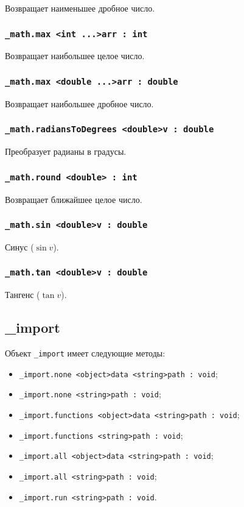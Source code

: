 \documentclass[a4paper, 14pt]{extarticle}
\newenvironment{icItems}
	{ \begin{itemize} [noitemsep,nolistsep] }
	{ \end{itemize} }
\begin{document}
Возвращает наименьшее дробное число.

\subsubsection{\lstinline|_math.max <int ...>arr : int|}

Возвращает наибольшее целое число.

\subsubsection{\lstinline|_math.max <double ...>arr : double|}

Возвращает наибольшее дробное число.

\subsubsection{\lstinline|_math.radiansToDegrees <double>v : double|}

Преобразует радианы в градусы.

\subsubsection{\lstinline|_math.round <double> : int|}

Возвращает ближайшее целое число.

\subsubsection{\lstinline|_math.sin <double>v : double|}

Синус ($\sin{v}$).

\subsubsection{\lstinline|_math.tan <double>v : double|}

Тангенс ($\tan{v}$).

\subsection{{\color{orange} \_import}}

Объект \lstinline|_import| имеет следующие методы:
\begin{icItems}
	\item \lstinline|_import.none <object>data <string>path : void|;
	\item \lstinline|_import.none <string>path : void|;
	\item \lstinline|_import.functions <object>data <string>path : void|;
	\item \lstinline|_import.functions <string>path : void|;
	\item \lstinline|_import.all <object>data <string>path : void|;
	\item \lstinline|_import.all <string>path : void|;
	\item \lstinline|_import.run <string>path : void|.
\end{icItems}
\end{document}
